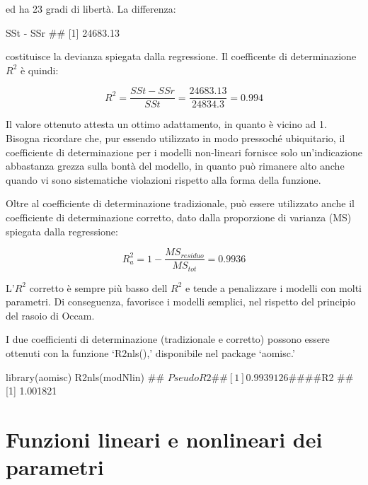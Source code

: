 \documentclass[a4paper,12pt,oneside]{book}
\newenvironment{Shaded}{\begin{snugshade}}{\end{snugshade}}
\newcommand{\SpecialCharTok}[1]{#1}
\newcommand{\DocumentationTok}[1]{#1}
\newcommand{\FunctionTok}[1]{#1}
\newcommand{\NormalTok}[1]{#1}
\begin{document}
ed ha 23 gradi di libertà. La differenza:

\begin{Shaded}
\begin{Highlighting}[]
\NormalTok{SSt }\SpecialCharTok{{-}}\NormalTok{ SSr}
\DocumentationTok{\#\# [1] 24683.13}
\end{Highlighting}
\end{Shaded}

costituisce la devianza spiegata dalla regressione. Il coefficente di determinazione \(R^2\) è quindi:

\[R^2 = \frac{SSt - SSr}{SSt} = \frac{24683.13}{24834.3} = 0.994\]

Il valore ottenuto attesta un ottimo adattamento, in quanto è vicino ad 1. Bisogna ricordare che, pur essendo utilizzato in modo pressoché ubiquitario, il coefficiente di determinazione per i modelli non-lineari fornisce solo un'indicazione abbastanza grezza sulla bontà del modello, in quanto può rimanere alto anche quando vi sono sistematiche violazioni rispetto alla forma della funzione.

Oltre al coefficiente di determinazione tradizionale, può essere utilizzato anche il coefficiente di determinazione corretto, dato dalla proporzione di varianza (MS) spiegata dalla regressione:

\[R_a^2  = 1 - \frac{MS_{residuo} }{MS_{tot} } = 0.9936\]

L'\(R^2\) corretto è sempre più basso dell \(R^2\) e tende a penalizzare i modelli con molti parametri. Di conseguenza, favorisce i modelli semplici, nel rispetto del principio del rasoio di Occam.

I due coefficienti di determinazione (tradizionale e corretto) possono essere ottenuti con la funzione `R2nls(),' disponibile nel package `aomisc.'

\begin{Shaded}
\begin{Highlighting}[]
\FunctionTok{library}\NormalTok{(aomisc)}
\FunctionTok{R2nls}\NormalTok{(modNlin)}
\DocumentationTok{\#\# $PseudoR2}
\DocumentationTok{\#\# [1] 0.9939126}
\DocumentationTok{\#\# }
\DocumentationTok{\#\# $R2}
\DocumentationTok{\#\# [1] 1.001821}
\end{Highlighting}
\end{Shaded}

\hypertarget{funzioni-lineari-e-nonlineari-dei-parametri}{%
\section{Funzioni lineari e nonlineari dei parametri}\label{funzioni-lineari-e-nonlineari-dei-parametri}}
\end{document}
